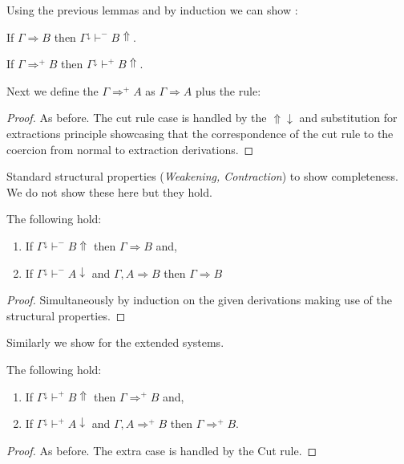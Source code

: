 Using the previous lemmas and by induction we can show :
\begin{theorem} 
	\label{soundnseq}
If   $\Gamma\Rightarrow B$ then $\Gamma^\downarrow\vdash^{-} B\Uparrow$.

	
\end{theorem}
\begin{theorem} 
	
	If   $\Gamma\Rightarrow^{+} B$ then $\Gamma^\downarrow\vdash^{+} B\Uparrow$.
\end{theorem}

Next we define the $\Gamma\Rightarrow^{+} A$ as $\Gamma\Rightarrow A$ plus the rule:
\begin{mathpar}
\end{mathpar}
\begin{proof}
As before. The cut rule case is handled by the $\Uparrow\downarrow$ and substitution for extractions principle showcasing that the correspondence of the cut rule to the coercion from normal to extraction derivations.
\end{proof}
Standard structural properties (\textit{Weakening, Contraction}) to show completeness. We do not show these here but they hold.
\begin{theorem} 
	\label{compseqcalc}
	The following hold:
	\begin{enumerate}
		\item If   $\Gamma^\downarrow\vdash^{-} B\Uparrow$ then $\Gamma\Rightarrow B$ and,
		\item 	If $\Gamma^\downarrow \vdash^{-} A\downarrow$ and $\Gamma,A\Rightarrow B$ then $\Gamma\Rightarrow B$   
	\end{enumerate}
\begin{proof}
	Simultaneously by induction on the given derivations making use of the structural properties.
\end{proof}
Similarly we show for the extended systems.
\begin{theorem} The following hold:
	\label{compseqcut}
	\begin{enumerate}
		\item If   $\Gamma^\downarrow\vdash^{+} B\Uparrow$ then  $\Gamma\Rightarrow^{+} B$ and,
		\item 	If $\Gamma^\downarrow \vdash^{+} A\downarrow$ and $\Gamma,A\Rightarrow^{+} B$ then $\Gamma\Rightarrow^{+} B$.   
	\end{enumerate}
\end{theorem}
\begin{proof}
	As before. The extra case is handled by the Cut rule.
\end{proof}
\end{theorem}
